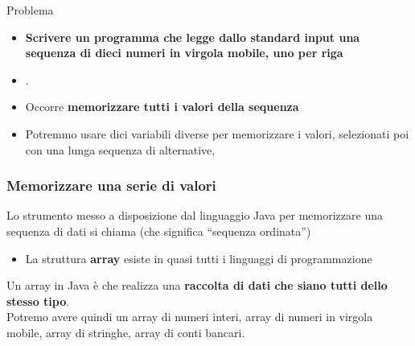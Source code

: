 \begin{frame}
\begin{block}{Problema}
\begin{itemize}
\item \textbf{\alert{Scrivere un programma che legge dallo standard input una sequenza di dieci numeri in virgola mobile, uno per riga}}
\item {}.
\end{itemize}
\end{block}
\begin{block}{}
\begin{itemize}
\item Occorre \textbf{memorizzare tutti i valori della sequenza}
\pause
\item Potremmo usare dici variabili diverse per memorizzare i valori, selezionati poi con una lunga sequenza di alternative,
\textbf{}
\end{itemize}
\end{block}
\end{frame}

\begin{frame}
\frametitle{Memorizzare una serie di valori}
\begin{block}{}
Lo strumento messo a disposizione dal linguaggio Java per memorizzare una sequenza di dati si chiama \textbf{}
(che significa ``sequenza ordinata'')
\begin{itemize}
\item La struttura \textbf{array} esiste in quasi tutti i linguaggi di programmazione
\end{itemize}
\end{block}
\begin{block}{}
Un array in Java è \textbf{} che realizza una \textbf{\alert{raccolta di dati che siano tutti dello stesso tipo}}.\\
Potremo avere quindi un array di numeri interi, array di numeri in virgola mobile, array di stringhe, array di conti bancari.
\end{block}
\end{frame}

